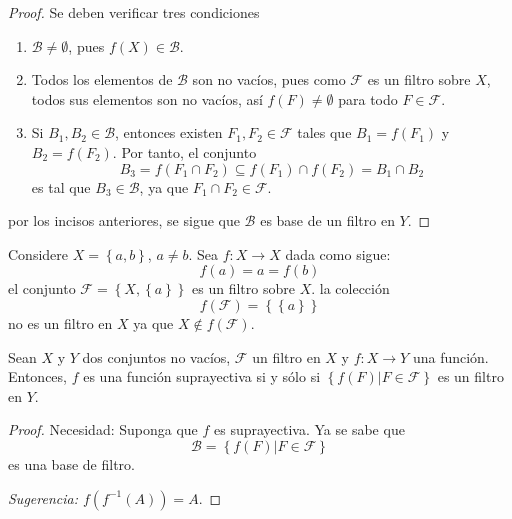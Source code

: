 \documentclass[12pt]{report}
\theoremstyle{largebreak}
\newcommand\cf[3]{\ensuremath{#1:#2\rightarrow#3}}
\begin{document}
    \begin{proof}
        Se deben verificar tres condiciones
        \begin{enumerate}
            \item $\mathcal{B}\neq\emptyset$, pues $f(X)\in\mathcal{B}$.
            \item Todos los elementos de $\mathcal{B}$ son no vacíos, pues como $\mathcal{F}$ es un filtro sobre $X$, todos sus elementos son no vacíos, así $f(F)\neq\emptyset$ para todo $F\in\mathcal{F}$.
            \item Si $B_1,B_2\in\mathcal{B}$, entonces existen $F_1,F_2\in\mathcal{F}$ tales que $B_1=f(F_1)$ y $B_2=f(F_2)$. Por tanto, el conjunto
            \begin{equation*}
                B_3=f(F_1\cap F_2)\subseteq f(F_1)\cap f(F_2)=B_1\cap B_2
            \end{equation*}
            es tal que $B_3\in\mathcal{B}$, ya que $F_1\cap F_2\in\mathcal{F}$.
        \end{enumerate}
        por los incisos anteriores, se sigue que $\mathcal{B}$ es base de un filtro en $Y$.
    \end{proof}

    \begin{exa}
        Considere $X=\left\{a,b \right\}$, $a\neq b$. Sea $\cf{f}{X}{X}$ dada como sigue:
        \begin{equation*}
            f(a)=a=f(b)
        \end{equation*}
        el conjunto $\mathcal{F}=\left\{X,\left\{a\right\} \right\}$ es un filtro sobre $X$. la colección
        \begin{equation*}
            f(\mathcal{F})=\left\{\left\{a\right\} \right\}
        \end{equation*}
        no es un filtro en $X$ ya que $X\notin f(\mathcal{F})$.
    \end{exa}

    \begin{propo}
        Sean $X$ y $Y$ dos conjuntos no vacíos, $\mathcal{F}$ un filtro en $X$ y $\cf{f}{X}{Y}$ una función. Entonces, $f$ es una función suprayectiva si y sólo si $\left\{f(F)\Big|F\in\mathcal{F} \right\}$ es un filtro en $Y$.
    \end{propo}

    \begin{proof}
        Necesidad: Suponga que $f$ es suprayectiva. Ya se sabe que
        \begin{equation*}
            \mathcal{B}=\left\{f(F)\Big|F\in\mathcal{F} \right\}
        \end{equation*}
        es una base de filtro.

        \textit{Sugerencia: $f(f^{-1}(A))=A$}.
    \end{proof}
\end{document}
